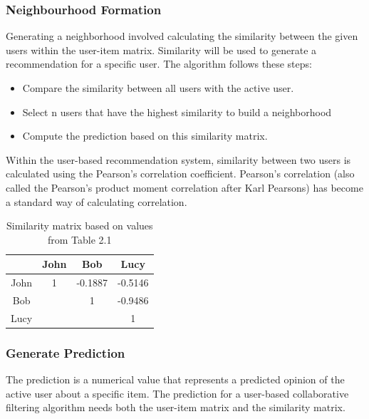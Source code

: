 \subsubsection{Neighbourhood Formation}
Generating a neighborhood involved calculating the similarity between the given users within the user-item matrix. Similarity will be used to generate a recommendation for a specific user.
The algorithm follows these steps:
\begin{itemize}
\item Compare the similarity between all users with the active user.
\item Select n users that have the highest similarity to build a neighborhood
\item Compute the prediction based on this similarity matrix.
\end{itemize}
Within the user-based recommendation system, similarity between two users is calculated using the Pearson’s correlation coefficient. Pearson’s correlation (also called the Pearson's product moment correlation after Karl Pearsons) has become a standard way of calculating correlation.

\begin{table}[ht]
\caption{Similarity matrix based on values from Table 2.1} %
\centering  %
\begin{tabular}{c c c c} %
\hline\hline                        %
 & John & Bob& Lucy \\ [0.5ex] %
\hline                  %

John & 1 & -0.1887  & -0.5146 \\
Bob &  & 1 & -0.9486 \\
Lucy &  & & 1 \\[1ex]      %
\hline %
\end{tabular}
\label{table:3} %
\end{table}

\subsubsection{Generate Prediction}
The prediction is a numerical value that represents a predicted opinion of the active user about a specific item. The prediction for a user-based collaborative filtering algorithm needs both the user-item matrix and the similarity matrix.
